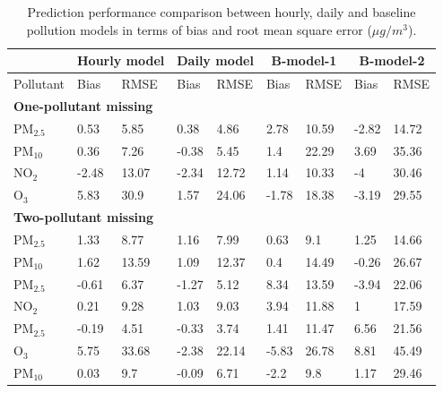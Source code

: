 \documentclass[
  12,
]{article}
\begin{document}
\begin{table}

\caption{Prediction performance comparison between hourly, daily and baseline pollution models in terms of bias and root mean square error ($\mu g/m^{3}$).}\label{tab:hourlydailycomparison}
\centering
\begin{tabular}[h]{lllllllll}
\hline\hline
\multicolumn{1}{c}{\textbf{ }} & \multicolumn{2}{c}{\textbf{Hourly model}} & \multicolumn{2}{c}{\textbf{Daily model}} & \multicolumn{2}{c}{\textbf{B-model-1}} & \multicolumn{2}{c}{\textbf{B-model-2}} \\\hline
Pollutant  & Bias & RMSE & Bias & RMSE & Bias & RMSE & Bias & RMSE\\\hline
\multicolumn{5}{l}{\textbf{One-pollutant missing}}\\\hline
\hspace{1em}PM$_{2.5}$ & 0.53 & 5.85 & 0.38 & 4.86 & 2.78 & 10.59 & -2.82 & 14.72\\
\hspace{1em}PM$_{10}$ & 0.36 & 7.26 & -0.38 & 5.45 & 1.4 & 22.29 & 3.69 & 35.36\\
\hspace{1em}NO$_{2}$  & -2.48 & 13.07 & -2.34 & 12.72 & 1.14 & 10.33 & -4 & 30.46\\
\hspace{1em}O$_{3}$   & 5.83 & 30.9 & 1.57 & 24.06 & -1.78 & 18.38 & -3.19 & 29.55\\\hline
\multicolumn{5}{l}{\textbf{Two-pollutant missing}}\\\hline
\hspace{1em}PM$_{2.5}$ & 1.33 & 8.77 & 1.16 & 7.99 & 0.63 & 9.1 & 1.25 & 14.66\\
\hspace{1em}PM$_{10}$ & 1.62 & 13.59 & 1.09 & 12.37 & 0.4 & 14.49 & -0.26 & 26.67\\
\hspace{1em}PM$_{2.5}$ & -0.61 & 6.37 & -1.27 & 5.12 & 8.34 & 13.59 & -3.94 & 22.06\\
\hspace{1em}NO$_{2}$  & 0.21 & 9.28 & 1.03 & 9.03 & 3.94 & 11.88 & 1 & 17.59\\
\hspace{1em}PM$_{2.5}$ & -0.19 & 4.51 & -0.33 & 3.74 & 1.41 & 11.47 & 6.56 & 21.56\\
\hspace{1em}O$_{3}$   & 5.75 & 33.68 & -2.38 & 22.14 & -5.83 & 26.78 & 8.81 & 45.49\\
\hspace{1em}PM$_{10}$ & 0.03 & 9.7 & -0.09 & 6.71 & -2.2 & 9.8 & 1.17 & 29.46\\

\end{tabular}
\end{table}
\end{document}

